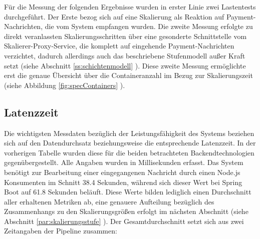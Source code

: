 

Für die Messung der folgenden Ergebnisse wurden in erster Linie zwei Lastentests durchgeführt. Der Erste bezog sich auf eine Skalierung als Reaktion auf Payment-Nachrichten, die vom System empfangen wurden. Die zweite Messung erfolgte zu direkt veranlassten Skalierungsschritten über eine gesonderte Schnittstelle vom Skalierer-Proxy-Service, die komplett auf eingehende Payment-Nachrichten verzichtet, dadurch allerdings auch das beschriebene Stufenmodell außer Kraft setzt (siehe Abschnitt \ref{ss:schichtenmodell} ). Diese zweite Messung ermöglichte erst die genaue Übersicht über die Containeranzahl im Bezug zur Skalierungszeit (siehe Abbildung \ref{fig:specContainers} ).


\subsection{Latenzzeit}
Die wichtigsten Messdaten bezüglich der Leistungsfähigkeit des Systems beziehen sich auf den Datendurchsatz beziehungsweise die entsprechende Latenzzeit. In der vorherigen Tabelle wurden diese für die beiden betrachteten Backendtechnologien gegenübergestellt. Alle Angaben wurden in Millisekunden erfasst. Das System benötigt zur Bearbeitung einer eingegangenen Nachricht durch einen Node.js Konsumenten im Schnitt 38.4 Sekunden, während sich dieser Wert bei Spring Boot auf 61.8 Sekunden beläuft. Diese Werte bilden lediglich einen Durchschnitt aller erhaltenen Metriken ab, eine genauere Aufteilung bezüglich des Zusammenhangs zu den Skalierungsgrößen erfolgt im nächsten Abschnitt (siehe Abschnitt \ref{par:skalierungsstufe} ). Der Gesamtdurchschnitt setzt sich aus zwei Zeitangaben der Pipeline zusammen: 

